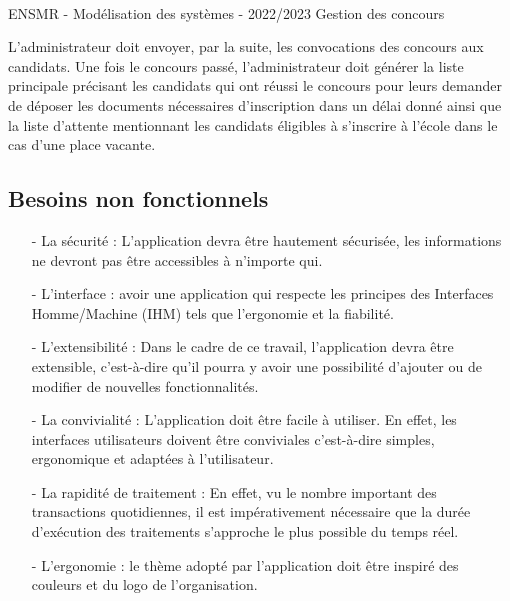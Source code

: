 \begin{itemize}
\vfill
\noindent\makebox[\linewidth]{\rule{.8\paperwidth}{.6pt}}\\[0.2cm]
ENSMR - Modélisation des systèmes - 2022/2023 \hfill Gestion des concours
\noindent\makebox[\linewidth]{\rule{.8\paperwidth}{.6pt}}

L'administrateur doit envoyer, par la suite, les convocations des concours aux candidats.
Une fois le concours passé, l'administrateur doit générer la liste principale précisant les candidats qui ont réussi le concours pour leurs demander de déposer les documents nécessaires d'inscription dans un délai donné ainsi que la liste d'attente mentionnant les candidats éligibles à s'inscrire à l'école dans le cas d'une place vacante. 

\end{itemize}

\subsection{Besoins non fonctionnels}
\setlength{\parindent}{5ex} 

\begin{itemize}
  \item[-] La sécurité : L’application devra être hautement sécurisée, les informations ne devront pas être accessibles à n’importe qui. \\[0.1cm]
  
  \item[-] L’interface : avoir une application qui respecte les principes des Interfaces Homme/Machine (IHM) tels que l'ergonomie et la fiabilité.\\[0.1cm]
  
  \item[-] L’extensibilité : Dans le cadre de ce travail, l’application devra être extensible, c’est-à-dire qu’il pourra y avoir une possibilité d’ajouter ou de modifier de nouvelles fonctionnalités. \\[0.1cm]
  
  \item[-] La convivialité : L’application doit être facile à utiliser. En effet, les interfaces utilisateurs doivent être conviviales c’est-à-dire simples, ergonomique et adaptées à l’utilisateur.\\[0.1cm]
  
  \item[-] La rapidité de traitement : En effet, vu le nombre important des transactions quotidiennes, il est impérativement nécessaire que la durée d’exécution des traitements s’approche le plus possible du temps réel.\\[0.1cm]
  
  \item[-] L’ergonomie : le thème adopté par l’application doit être inspiré des couleurs et du logo de l’organisation. \\[0.1cm]
  
\end{itemize}

